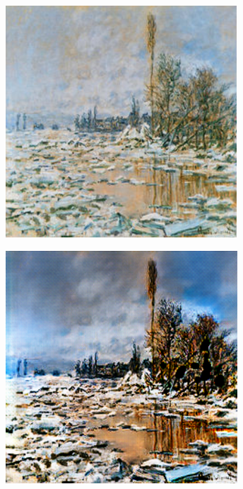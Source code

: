 \begin{figure}
\begin{subfigure}[t]{.14\textwidth}
  \end{subfigure}
  \hfill
  \begin{subfigure}[t]{.14\textwidth}
    \centering
    \includegraphics[width=\linewidth]{images/cycleGanResults/monet_input2.png}
  \end{subfigure}
  \begin{subfigure}[t]{.14\textwidth}
    \centering
    \includegraphics[width=\linewidth]{images/cycleGanResults/monet_output2.png}

\end{subfigure}
\end{figure}
